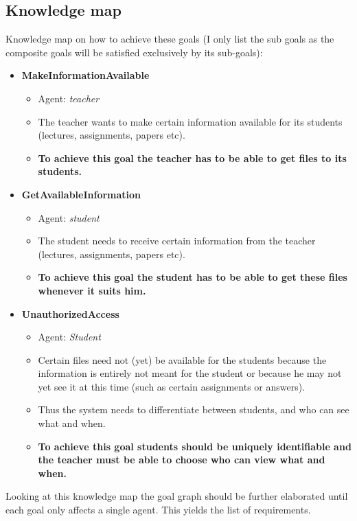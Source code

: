 \subsection*{Knowledge map}
Knowledge map on how to achieve these goals (I only list the sub goals as the composite goals will be satisfied exclusively by its sub-goals):

\begin{itemize}
	\item \textbf{MakeInformationAvailable}
	\begin{itemize}
		\item Agent: \emph{teacher}
		\item The teacher wants to make certain information available for its students (lectures, assignments, papers etc).
		\item \textbf{To achieve this goal the teacher has to be able to get files to its students.}
	\end{itemize}
	
	\item \textbf{GetAvailableInformation}
	\begin{itemize}
		\item Agent: \emph{student}
		\item The student needs to receive certain information from the teacher (lectures, assignments, papers etc).
		\item \textbf{To achieve this goal the student has to be able to get these files whenever it suits him.}
	\end{itemize}
	
	\item \textbf{UnauthorizedAccess}
	\begin{itemize}
		\item Agent: \emph{Student}
		\item Certain files need not (yet) be available for the students because the information is entirely not meant for the student or because he may not yet see it at this time (such as certain assignments or answers).
		\item Thus the system needs to differentiate between students, and who can see what and when. 
		\item \textbf{To achieve this goal students should be uniquely identifiable and the teacher must be able to choose who can view what and when.}
	\end{itemize}
\end{itemize}

Looking at this knowledge map the goal graph should be further elaborated until each goal only affects a single agent. This yields the list of requirements.

